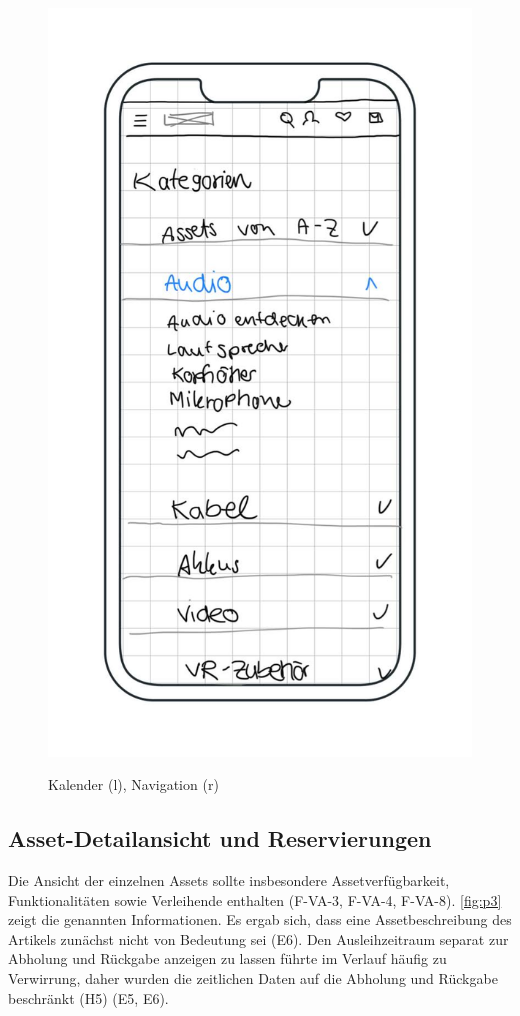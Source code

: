 \begin{figure}[h]
    \includegraphics[scale=0.4]{Bilder/Mockups/Kategorien.jpg}
    \label{fig:kalender}
    \caption[Kalenderkomponente]{Kalender (l), Navigation (r)}
\end{figure}

\subsection{Asset-Detailansicht und Reservierungen}
Die Ansicht der einzelnen Assets sollte insbesondere Assetverfügbarkeit, Funktionalitäten sowie
Verleihende enthalten (F-VA-3, F-VA-4, F-VA-8). \ref{fig:p3} zeigt die genannten Informationen. Es
ergab sich, dass eine Assetbeschreibung des Artikels zunächst nicht von Bedeutung sei (E6). Den
Ausleihzeitraum separat zur Abholung und Rückgabe anzeigen zu lassen führte im Verlauf häufig zu
Verwirrung, daher wurden die zeitlichen Daten auf die Abholung und Rückgabe beschränkt (H5) (E5, E6).

